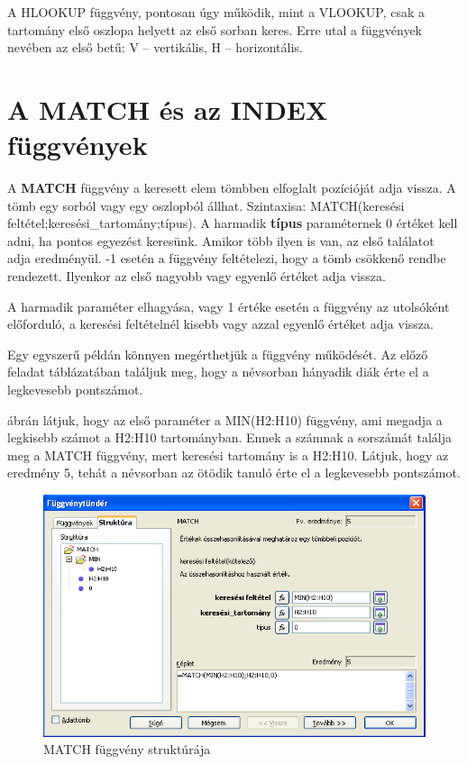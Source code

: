 A HLOOKUP függvény, pontosan úgy működik, mint a VLOOKUP,
csak a tartomány első oszlopa helyett az első sorban keres.
Erre utal a függvények nevében az első betű: V --
vertikális, H --  horizontális.


\section{A MATCH és az INDEX függvények}

A \textbf{MATCH} függvény a keresett elem tömbben elfoglalt
pozícióját adja vissza. A tömb egy sorból vagy egy
oszlopból állhat. Szintaxisa: MATCH(keresési
feltétel;keresési\_tartomány;típus). A harmadik
\textbf{típus} paraméternek 0 értéket kell adni, ha pontos
egyezést keresünk. Amikor több ilyen is van, az első
találatot adja eredményül. -1 esetén a függvény
feltételezi, hogy a tömb csökkenő rendbe rendezett. Ilyenkor
az első nagyobb vagy egyenlő értéket adja vissza.

A harmadik paraméter elhagyása, vagy 1 értéke esetén a
függvény az utolsóként előforduló, a keresési
feltételnél kisebb vagy azzal egyenlő értéket adja vissza.

Egy egyszerű példán könnyen megérthetjük a függvény
működését. Az előző feladat táblázatában
 találjuk meg, hogy a névsorban hányadik diák érte el a
legkevesebb pontszámot.

 ábrán látjuk, hogy az első paraméter a MIN(H2:H10)
függvény, ami megadja a legkisebb számot a H2:H10 tartományban.
Ennek a számnak a sorszámát találja meg a MATCH függvény,
mert keresési tartomány is a H2:H10. Látjuk, hogy az eredmény
5, tehát a névsorban az ötödik  tanuló érte el a
legkevesebb pontszámot.

\begin{figure}[!h]
\begin{center}
\includegraphics[width=15.999cm]{oocalcv1-img101.png}
\caption{MATCH függvény struktúrája}\label{MATCHFüggvény}
\end{center}
\end{figure}

